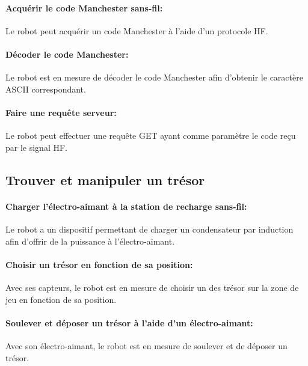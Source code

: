 \paragraph{Acquérir le code Manchester sans-fil:}

Le robot peut acquérir un code Manchester à l'aide d'un protocole HF.

\paragraph{Décoder le code Manchester:}

Le robot est en mesure de décoder le code Manchester afin d'obtenir le caractère ASCII correspondant.

\paragraph{Faire une requête serveur:}

Le robot peut effectuer une requête GET ayant comme paramètre le code reçu par le signal HF.

\subsection{Trouver et manipuler un trésor}

\paragraph{Charger l'électro-aimant à la station de recharge sans-fil:}

Le robot a un dispositif permettant de charger un condensateur par induction afin d'offrir de la puissance à l'électro-aimant.

\paragraph{Choisir un trésor en fonction de sa position:}

Avec ses capteurs, le robot est en mesure de choisir un des trésor sur la zone de jeu en fonction de sa position.

\paragraph{Soulever et déposer un trésor à l'aide d'un électro-aimant:}

Avec son électro-aimant, le robot est en mesure de soulever et de déposer un trésor.

